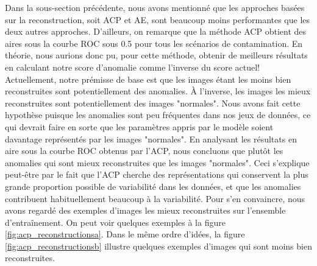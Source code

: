 Dans la sous-section précédente, nous avons mentionné que les approches basées sur la reconstruction, soit ACP et AE, sont beaucoup moins performantes que les deux autres approches. D'ailleurs, on remarque que la méthode ACP obtient des aires sous la courbe ROC sous 0.5 pour tous les scénarios de contamination. En théorie, nous aurions donc pu, pour cette méthode, obtenir de meilleurs résultats en calculant notre score d'anomalie comme l'inverse du score actuel! Actuellement, notre prémisse de base est que les images étant les moins bien reconstruites sont potentiellement des anomalies. À l'inverse, les images les mieux reconstruites sont potentiellement des images "normales". Nous avons fait cette hypothèse puisque les anomalies sont peu fréquentes dans nos jeux de données, ce qui devrait faire en sorte que les paramètres appris par le modèle soient davantage représentés par les images "normales". En analysant les résultats en aire sous la courbe ROC obtenus par l'ACP, nous concluons que \DIFdelbegin {}\DIFdelend \DIFaddbegin {}\DIFaddend plutôt les anomalies qui sont mieux reconstruites que les images "normales". Ceci s'explique peut-être par le fait que l'ACP cherche des représentations qui conservent la plus grande proportion possible de variabilité dans les données, et que les anomalies contribuent habituellement beaucoup à la variabilité. Pour s'en convaincre, nous avons regardé des exemples d'images les mieux reconstruites sur l'ensemble d'entraînement. On peut voir quelques exemples à la figure \ref{fig:acp_reconstructionsa}. Dans le même ordre d'idées, la figure \ref{fig:acp_reconstructionsb} illustre quelques exemples d'images qui sont moins bien reconstruites. 

